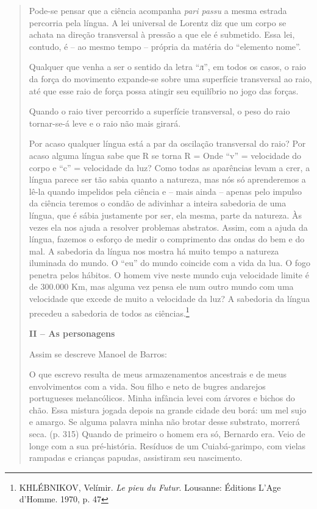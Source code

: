 \begin{quote}
Pode-se pensar que a ciência acompanha \emph{pari passu} a mesma estrada
percorria pela língua. A lei universal de Lorentz diz que um corpo se
achata na direção transversal à pressão a que ele é submetido. Essa lei,
contudo, é -- ao mesmo tempo -- própria da matéria do ``elemento nome''.

Qualquer que venha a ser o sentido da letra ``л'', em todos os casos, o
raio da força do movimento expande-se sobre uma superfície transversal
ao raio, até que esse raio de força possa atingir seu equilíbrio no jogo
das forças.

Quando o raio tiver percorrido a superfície transversal, o peso do raio
tornar-se-á leve e o raio não mais girará.

Por acaso qualquer língua está a par da oscilação transversal do raio?
Por acaso alguma língua sabe que R se torna R =
Onde ``v'' =
velocidade do corpo e ``c'' = velocidade da luz? Como todas as
aparências levam a crer, a língua parece ser tão sabia quanto a
natureza, mas nós só aprenderemos a lê-la quando impelidos pela ciência
e -- mais ainda -- apenas pelo impulso da ciência teremos o condão de
adivinhar a inteira sabedoria de uma língua, que é sábia justamente por
ser, ela mesma, parte da natureza. Às vezes ela nos ajuda a resolver
problemas abstratos. Assim, com a ajuda da língua, fazemos o esforço de
medir o comprimento das ondas do bem e do mal. A sabedoria da língua nos
mostra há muito tempo a natureza iluminada do mundo. O ``eu'' do mundo
coincide com a vida da lua. O fogo penetra pelos hábitos. O homem vive
neste mundo cuja velocidade limite é de 300.000 Km, mas alguma vez pensa
ele num outro mundo com uma velocidade que excede de muito a velocidade
da luz? A sabedoria da língua precedeu a sabedoria de todos as
ciências.\footnote{KHLÉBNIKOV, Velímir. \emph{Le pieu du Futur}.
  Lousanne: Éditions L'Age d'Homme. 1970, p. 47}

\textbf{II -- As personagens}

Assim se descreve Manoel de Barros:

O que escrevo resulta de meus armazenamentos ancestrais e de meus
envolvimentos com a vida. Sou filho e neto de bugres andarejos
portugueses melancólicos. Minha infância levei com árvores e bichos do
chão. Essa mistura jogada depois na grande cidade deu borá: um mel sujo
e amargo. Se alguma palavra minha não brotar desse substrato, morrerá
seca. (p. 315) Quando de primeiro o homem era só, Bernardo era. Veio de
longe com a sua pré-história. Resíduos de um Cuiabá-garimpo, com vielas
rampadas e crianças papudas, assistiram seu nascimento.


\end{quote}
